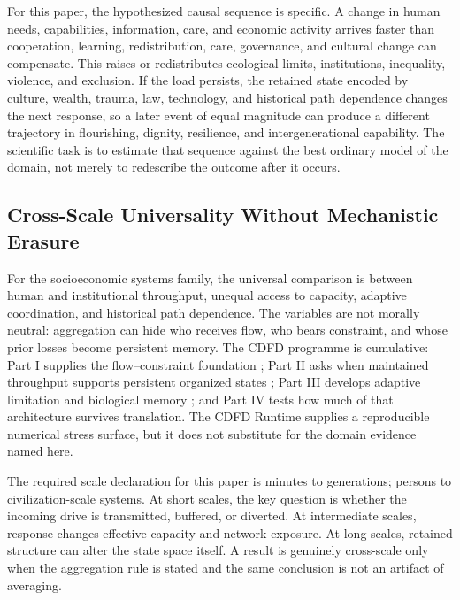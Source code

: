 \documentclass[11pt,a4paper]{article}
\begin{document}
For this paper, the hypothesized causal sequence is specific. A change in
human needs, capabilities, information, care, and economic activity arrives faster than cooperation, learning, redistribution, care, governance, and cultural change can compensate.
This raises or redistributes ecological limits, institutions, inequality, violence, and exclusion. If the load persists,
the retained state encoded by culture, wealth, trauma, law, technology, and historical path dependence changes the next response, so a later event of equal
magnitude can produce a different trajectory in flourishing, dignity, resilience, and intergenerational capability. The
scientific task is to estimate that sequence against the best ordinary model of
the domain, not merely to redescribe the outcome after it occurs.

\subsection{Cross-Scale Universality Without Mechanistic Erasure}

For the socioeconomic systems family, the universal comparison is between human and institutional throughput, unequal access to capacity, adaptive coordination, and historical path dependence. The variables are not morally neutral: aggregation can hide who receives flow, who bears constraint, and whose prior losses become persistent memory. \cite{BarabasiAlbert1999,WattsStrogatz1998,Holling1973,Shannon1948}
The CDFD programme is cumulative: Part I supplies the flow--constraint
foundation \cite{MujjabiPartI2026}; Part II asks when maintained throughput
supports persistent organized states \cite{MujjabiPartII2026}; Part III
develops adaptive limitation and biological memory \cite{MujjabiPartIII2026};
and Part IV \cite{MujjabiPartIV2026} tests how much of that architecture
survives translation. The CDFD Runtime \cite{CDFDRuntime2026} supplies a
reproducible numerical stress surface, but it does not substitute for the
domain evidence named here.

The required scale declaration for this paper is minutes to generations; persons to civilization-scale systems. At short
scales, the key question is whether the incoming drive is transmitted,
buffered, or diverted. At intermediate scales, response changes effective
capacity and network exposure. At long scales, retained structure can alter the
state space itself. A result is genuinely cross-scale only when the aggregation
rule is stated and the same conclusion is not an artifact of averaging.
\end{document}
